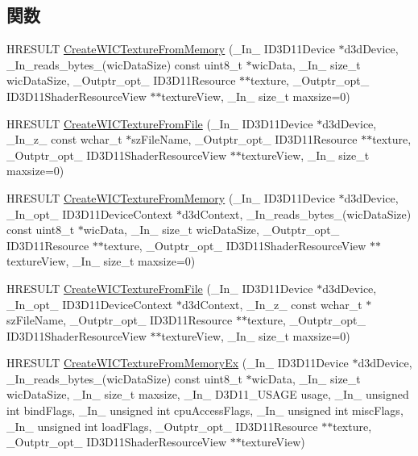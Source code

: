 \subsection*{関数}
\begin{DoxyCompactItemize}
\item 
H\+R\+E\+S\+U\+LT \mbox{\hyperlink{namespace_direct_x_a3ce3ec875ba946920f2e8939915fd594}{Create\+W\+I\+C\+Texture\+From\+Memory}} (\+\_\+\+In\+\_\+ I\+D3\+D11\+Device $\ast$d3d\+Device, \+\_\+\+In\+\_\+reads\+\_\+bytes\+\_\+(wic\+Data\+Size) const uint8\+\_\+t $\ast$wic\+Data, \+\_\+\+In\+\_\+ size\+\_\+t wic\+Data\+Size, \+\_\+\+Outptr\+\_\+opt\+\_\+ I\+D3\+D11\+Resource $\ast$$\ast$texture, \+\_\+\+Outptr\+\_\+opt\+\_\+ I\+D3\+D11\+Shader\+Resource\+View $\ast$$\ast$texture\+View, \+\_\+\+In\+\_\+ size\+\_\+t maxsize=0)
\item 
H\+R\+E\+S\+U\+LT \mbox{\hyperlink{namespace_direct_x_a5fdba9031952424bfe7d31e0d859edd2}{Create\+W\+I\+C\+Texture\+From\+File}} (\+\_\+\+In\+\_\+ I\+D3\+D11\+Device $\ast$d3d\+Device, \+\_\+\+In\+\_\+z\+\_\+ const wchar\+\_\+t $\ast$sz\+File\+Name, \+\_\+\+Outptr\+\_\+opt\+\_\+ I\+D3\+D11\+Resource $\ast$$\ast$texture, \+\_\+\+Outptr\+\_\+opt\+\_\+ I\+D3\+D11\+Shader\+Resource\+View $\ast$$\ast$texture\+View, \+\_\+\+In\+\_\+ size\+\_\+t maxsize=0)
\item 
H\+R\+E\+S\+U\+LT \mbox{\hyperlink{namespace_direct_x_afe67970a867e51ea4f153cf50cd68f86}{Create\+W\+I\+C\+Texture\+From\+Memory}} (\+\_\+\+In\+\_\+ I\+D3\+D11\+Device $\ast$d3d\+Device, \+\_\+\+In\+\_\+opt\+\_\+ I\+D3\+D11\+Device\+Context $\ast$d3d\+Context, \+\_\+\+In\+\_\+reads\+\_\+bytes\+\_\+(wic\+Data\+Size) const uint8\+\_\+t $\ast$wic\+Data, \+\_\+\+In\+\_\+ size\+\_\+t wic\+Data\+Size, \+\_\+\+Outptr\+\_\+opt\+\_\+ I\+D3\+D11\+Resource $\ast$$\ast$texture, \+\_\+\+Outptr\+\_\+opt\+\_\+ I\+D3\+D11\+Shader\+Resource\+View $\ast$$\ast$texture\+View, \+\_\+\+In\+\_\+ size\+\_\+t maxsize=0)
\item 
H\+R\+E\+S\+U\+LT \mbox{\hyperlink{namespace_direct_x_a8907d700dcbb64e9a172ac986ade4877}{Create\+W\+I\+C\+Texture\+From\+File}} (\+\_\+\+In\+\_\+ I\+D3\+D11\+Device $\ast$d3d\+Device, \+\_\+\+In\+\_\+opt\+\_\+ I\+D3\+D11\+Device\+Context $\ast$d3d\+Context, \+\_\+\+In\+\_\+z\+\_\+ const wchar\+\_\+t $\ast$sz\+File\+Name, \+\_\+\+Outptr\+\_\+opt\+\_\+ I\+D3\+D11\+Resource $\ast$$\ast$texture, \+\_\+\+Outptr\+\_\+opt\+\_\+ I\+D3\+D11\+Shader\+Resource\+View $\ast$$\ast$texture\+View, \+\_\+\+In\+\_\+ size\+\_\+t maxsize=0)
\item 
H\+R\+E\+S\+U\+LT \mbox{\hyperlink{namespace_direct_x_a6f07a913b5f44a124de427d73afea1a4}{Create\+W\+I\+C\+Texture\+From\+Memory\+Ex}} (\+\_\+\+In\+\_\+ I\+D3\+D11\+Device $\ast$d3d\+Device, \+\_\+\+In\+\_\+reads\+\_\+bytes\+\_\+(wic\+Data\+Size) const uint8\+\_\+t $\ast$wic\+Data, \+\_\+\+In\+\_\+ size\+\_\+t wic\+Data\+Size, \+\_\+\+In\+\_\+ size\+\_\+t maxsize, \+\_\+\+In\+\_\+ D3\+D11\+\_\+\+U\+S\+A\+GE usage, \+\_\+\+In\+\_\+ unsigned int bind\+Flags, \+\_\+\+In\+\_\+ unsigned int cpu\+Access\+Flags, \+\_\+\+In\+\_\+ unsigned int misc\+Flags, \+\_\+\+In\+\_\+ unsigned int load\+Flags, \+\_\+\+Outptr\+\_\+opt\+\_\+ I\+D3\+D11\+Resource $\ast$$\ast$texture, \+\_\+\+Outptr\+\_\+opt\+\_\+ I\+D3\+D11\+Shader\+Resource\+View $\ast$$\ast$texture\+View)

\end{DoxyCompactItemize}
